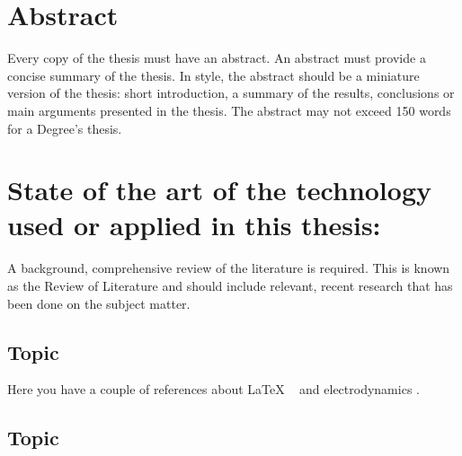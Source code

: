 \documentclass[a4paper,12pt]{article}
\begin{document}
\newpage
{\hypersetup{linkcolor=black}
\tableofcontents
}

\newpage
{\hypersetup{linkcolor=black}
\listoffigures
\lstlistoflistings
\listoftables
}

\newpage
\printacronyms[include=abbrev,name=Abbreviations]

\newpage
\section*{Abstract}

{Every copy of the thesis must have an abstract. An abstract must provide a concise summary of the thesis. In style, the
abstract should be a miniature version of the thesis: short introduction, a summary of the results, conclusions or main
arguments presented in the thesis. The abstract may not exceed 150 words for a Degree’s thesis.}

\newpage


\newpage



\clearpage\section{State of the art of the technology used or applied in this thesis:}

{A background, comprehensive review of the literature is required. This is known as the Review of Literature and should
include relevant, recent research that has been done on the subject matter.}

\subsection{Topic}

Here you have a couple of references about LaTeX ~\cite{latexcompanion} and electrodynamics \cite{einstein}.

\bigskip

\subsection{Topic}


\end{document}

